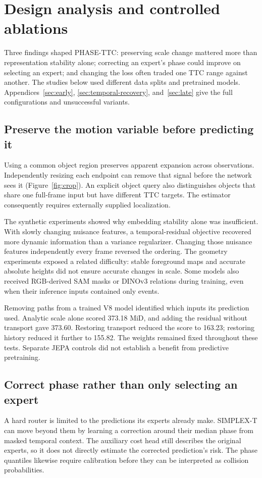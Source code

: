 \section{Design analysis and controlled ablations}
\label{sec:design-analysis}
Three findings shaped PHASE-TTC: preserving scale change mattered more than representation stability alone; correcting an expert's phase could improve on selecting an expert; and changing the loss often traded one TTC range against another. The studies below used different data splits and pretrained models. Appendices~\ref{sec:early}, \ref{sec:temporal-recovery}, and~\ref{sec:late} give the full configurations and unsuccessful variants.

\subsection{Preserve the motion variable before predicting it}
Using a common object region preserves apparent expansion across observations. Independently resizing each endpoint can remove that signal before the network sees it (Figure~\ref{fig:crop}). An explicit object query also distinguishes objects that share one full-frame input but have different TTC targets. The estimator consequently requires externally supplied localization. 

The synthetic experiments showed why embedding stability alone was insufficient. With slowly changing nuisance features, a temporal-residual objective recovered more dynamic information than a variance regularizer. Changing those nuisance features independently every frame reversed the ordering. The geometry experiments exposed a related difficulty: stable foreground maps and accurate absolute heights did not ensure accurate changes in scale. Some models also received RGB-derived SAM masks or DINOv3 relations during training, even when their inference inputs contained only events. 

Removing paths from a trained V8 model identified which inputs its prediction used. Analytic scale alone scored 373.18 MiD, and adding the residual without transport gave 373.60. Restoring transport reduced the score to 163.23; restoring history reduced it further to 155.82. The weights remained fixed throughout these tests. Separate JEPA controls did not establish a benefit from predictive pretraining. 

\subsection{Correct phase rather than only selecting an expert}
A hard router is limited to the predictions its experts already make. SIMPLEX-T can move beyond them by learning a correction around their median phase from masked temporal context. The auxiliary cost head still describes the original experts, so it does not directly estimate the corrected prediction's risk. The phase quantiles likewise require calibration before they can be interpreted as collision probabilities. 

